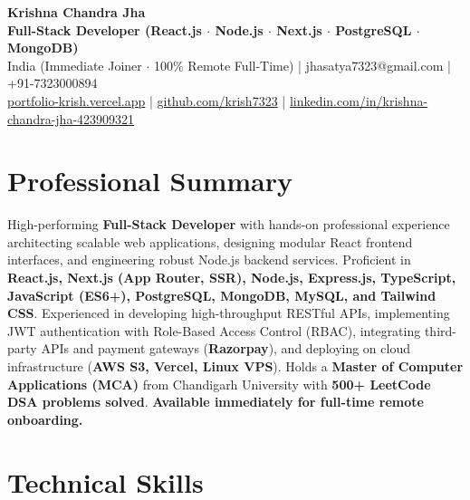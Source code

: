 \documentclass[a4paper,10pt]{article}
\begin{document}
\begin{center}

    {\LARGE \textbf{Krishna Chandra Jha}} \\[2.5pt]

    \textbf{Full-Stack Developer (React.js $\cdot$ Node.js $\cdot$ Next.js $\cdot$ PostgreSQL $\cdot$ MongoDB)} \\[3.5pt]

    India (Immediate Joiner $\cdot$ 100\% Remote Full-Time)
    \quad | \quad
    jhasatya7323@gmail.com
    \quad | \quad
    +91-7323000894
    \\[2.5pt]

    \href{https://portfolio-ashen-alpha-dv0whhsamo.vercel.app/}{portfolio-krish.vercel.app}
    \quad | \quad
    \href{https://github.com/krish7323}{github.com/krish7323}
    \quad | \quad
    \href{https://linkedin.com/in/krishna-chandra-jha-423909321}
    {linkedin.com/in/krishna-chandra-jha-423909321}

\end{center}

\section*{Professional Summary}

High-performing \textbf{Full-Stack Developer} with hands-on professional experience architecting scalable web applications, designing modular React frontend interfaces, and engineering robust Node.js backend services. Proficient in \textbf{React.js, Next.js (App Router, SSR), Node.js, Express.js, TypeScript, JavaScript (ES6+), PostgreSQL, MongoDB, MySQL, and Tailwind CSS}. Experienced in developing high-throughput RESTful APIs, implementing JWT authentication with Role-Based Access Control (RBAC), integrating third-party APIs and payment gateways (\textbf{Razorpay}), and deploying on cloud infrastructure (\textbf{AWS S3, Vercel, Linux VPS}). Holds a \textbf{Master of Computer Applications (MCA)} from Chandigarh University with \textbf{500+ LeetCode DSA problems solved}. \textbf{Available immediately for full-time remote onboarding.}

\section*{Technical Skills}
\end{document}

